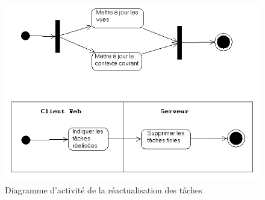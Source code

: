 		\begin{figure}[H]
			\begin{center}
				\includegraphics[scale=0.7]{diagrams/activiteReview.png}
				\caption{Diagramme d'activité de la réactualisation des tâches}
			\end{center}
		\end{figure}
		
		
	
		
		
		
		
